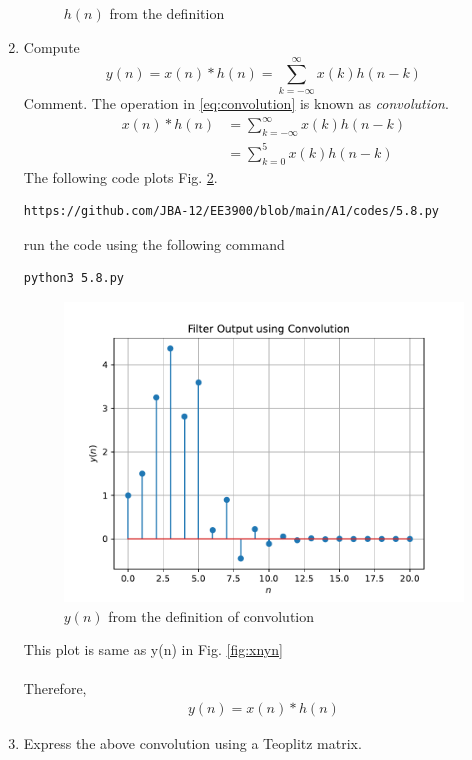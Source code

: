 \documentclass[journal,12pt,twocolumn]{IEEEtran}
\renewcommand\thesection{\arabic{section}}
\begin{document}
\begin{enumerate}[label=\thesection.\arabic*]
\begin{figure}[!ht]
\caption{$h(n)$ from the definition}
\label{fig:hndef}
\end{figure}
%
\item Compute 
%
\begin{equation}
\label{eq:convolution}
y(n) = x(n)*h(n) = \sum_{k=-\infty}^{\infty}x(k)h(n-k)
\end{equation}
%
Comment. The operation in \eqref{eq:convolution} is known as
{\em convolution}.
%
\\
\solution 
\begin{align}
x(n)*h(n) &= \sum_{k=-\infty}^{\infty}x(k)h(n-k)\\ &= \sum_{k=0}^{5}x(k)h(n-k)
\end{align}
The following code plots Fig. \ref{fig:ynconv}.
%
\begin{lstlisting}
https://github.com/JBA-12/EE3900/blob/main/A1/codes/5.8.py
\end{lstlisting}
run the code using the following command
\begin{lstlisting}
python3 5.8.py
\end{lstlisting}
\begin{figure}[!htbp]
\centering
\includegraphics[width=\columnwidth]{./figs/ynconv}
\caption{$y(n)$ from the definition of convolution}
\label{fig:ynconv}
\end{figure}
This plot is same as y(n) in Fig. \ref{fig:xnyn}\\\\
Therefore,
\begin{align}
y(n) = x(n) * h(n)
\end{align}
\item Express the above convolution using a Teoplitz matrix.\\

\end{enumerate}
\end{document}
